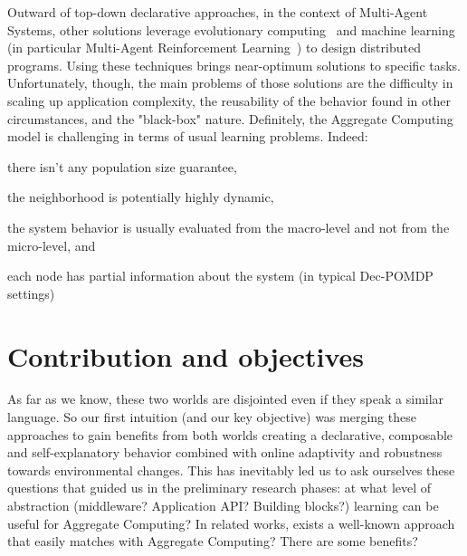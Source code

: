 \documentclass[conference]{IEEEtran}
\begin{document}
Outward of top-down declarative approaches, in the context of Multi-Agent Systems, other solutions leverage evolutionary computing~\cite{DBLP:journals/swarm/BrambillaFBD13} and machine learning (in particular Multi-Agent Reinforcement Learning~\cite{DBLP:journals/tcyb/NguyenNN20}) to design distributed programs.
Using these techniques brings near-optimum solutions to specific tasks.
Unfortunately, though, the main problems of those solutions are the difficulty in scaling up application complexity, the reusability of the behavior found in other circumstances, and the "black-box" nature. 
%
Definitely, the Aggregate Computing model is challenging in terms of usual learning problems. Indeed:
\begin{enumerate*}[label=(\roman*)]
\item there isn't any population size guarantee,
\item the neighborhood is potentially highly dynamic,
\item the system behavior is usually evaluated from the macro-level and not from the micro-level, and
\item each node has partial information about the system (in typical Dec-POMDP~\cite{DBLP:conf/uai/BernsteinZI00} settings)
\end{enumerate*}
\section{Contribution and objectives}
As far as we know, these two worlds are disjointed even if they speak a similar language. So our first intuition (and our key objective) was merging these approaches to gain benefits from both worlds creating a declarative, 
composable and self-explanatory behavior combined with online adaptivity and robustness towards environmental changes.
%
This has inevitably led us to ask ourselves these questions that guided us in the preliminary research phases: at what level of abstraction (middleware? Application API? Building blocks?) learning can be useful for Aggregate Computing? 
In related works, exists a well-known approach that easily matches with Aggregate Computing? There are some benefits?
%
\end{document}
